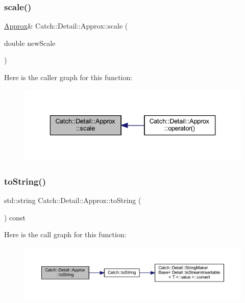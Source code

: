 \subsubsection{\texorpdfstring{scale()}{scale()}}
{\footnotesize\ttfamily \hyperlink{class_catch_1_1_detail_1_1_approx}{Approx}\& Catch\+::\+Detail\+::\+Approx\+::scale (\begin{DoxyParamCaption}\item[{double}]{new\+Scale }\end{DoxyParamCaption})\hspace{0.3cm}{\ttfamily [inline]}}

Here is the caller graph for this function\+:\nopagebreak
\begin{figure}[H]
\begin{center}
\leavevmode
\includegraphics[width=336pt]{class_catch_1_1_detail_1_1_approx_acd80f0737bf38112beacd5ca95bef113_icgraph}
\end{center}
\end{figure}
\hypertarget{class_catch_1_1_detail_1_1_approx_a972fd9ac60607483263f1b0f0f9955e6}{}\label{class_catch_1_1_detail_1_1_approx_a972fd9ac60607483263f1b0f0f9955e6} 
\subsubsection{\texorpdfstring{to\+String()}{toString()}}
{\footnotesize\ttfamily std\+::string Catch\+::\+Detail\+::\+Approx\+::to\+String (\begin{DoxyParamCaption}{ }\end{DoxyParamCaption}) const\hspace{0.3cm}{\ttfamily [inline]}}

Here is the call graph for this function\+:\nopagebreak
\begin{figure}[H]
\begin{center}
\leavevmode
\includegraphics[width=350pt]{class_catch_1_1_detail_1_1_approx_a972fd9ac60607483263f1b0f0f9955e6_cgraph}
\end{center}
\end{figure}


